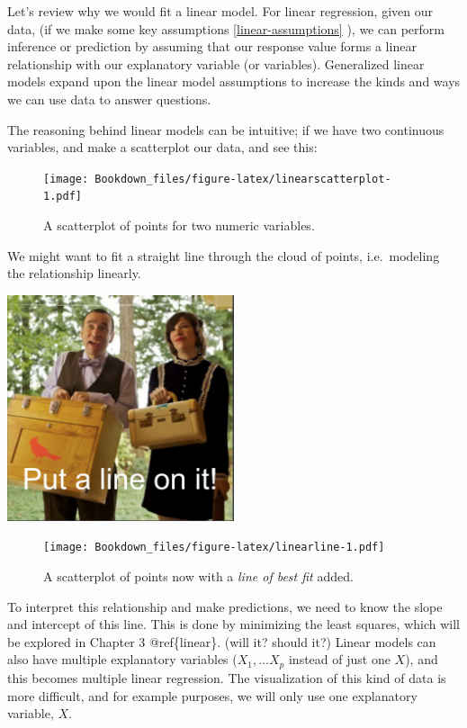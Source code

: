 \documentclass[
]{book}
\begin{document}
Let's review why we would fit a linear model. For linear regression, given our data, (if we make some key assumptions \ref{linear-assumptions} ), we can perform inference or prediction by assuming that our response value forms a linear relationship with our explanatory variable (or variables). Generalized linear models expand upon the linear model assumptions to increase the kinds and ways we can use data to answer questions.

The reasoning behind linear models can be intuitive; if we have two continuous variables, and make a scatterplot our data, and see this:

\begin{figure}
\centering
\texttt{[image: Bookdown\_files/figure-latex/linearscatterplot-1.pdf]}
\caption{\label{fig:linearscatterplot}A scatterplot of points for two numeric variables.}
\end{figure}

We might want to fit a straight line through the cloud of points, i.e.~modeling the relationship linearly.

\includegraphics[width=0.5\textwidth,height=\textheight]{images/put_a_bird.png}

\begin{figure}
\centering
\texttt{[image: Bookdown\_files/figure-latex/linearline-1.pdf]}
\caption{\label{fig:linearline}A scatterplot of points now with a \emph{line of best fit} added.}
\end{figure}

To interpret this relationship and make predictions, we need to know the slope and intercept of this line. This is done by minimizing the least squares, which will be explored in Chapter 3 @ref\{linear\}. (will it? should it?)
Linear models can also have multiple explanatory variables (\(X_1, \ldots X_p\) instead of just one \(X\)), and this becomes multiple linear regression. The visualization of this kind of data is more difficult, and for example purposes, we will only use one explanatory variable, \(X\).
\end{document}
